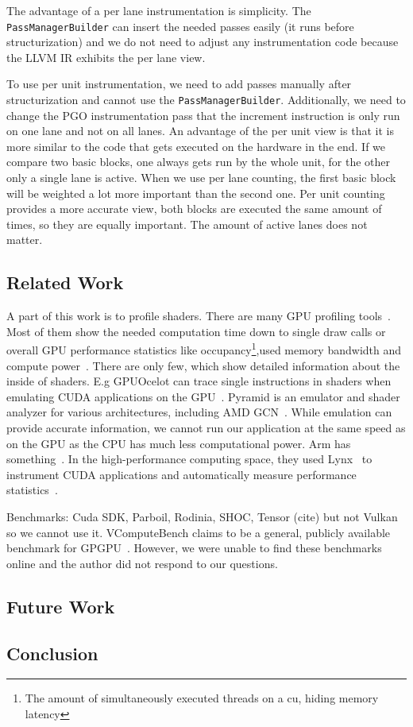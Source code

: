 The advantage of a per lane instrumentation is simplicity. The \texttt{PassManagerBuilder} can insert the needed passes easily (it runs before structurization) and we do not need to adjust any instrumentation code because the LLVM IR exhibits the per lane view.

To use per unit instrumentation, we need to add passes manually after structurization and cannot use the \texttt{PassManagerBuilder}.
Additionally, we need to change the PGO instrumentation pass that the increment instruction is only run on one lane and not on all lanes.
An advantage of the per unit view is that it is more similar to the code that gets executed on the hardware in the end.
If we compare two basic blocks, one always gets run by the whole unit, for the other only a single lane is active.
When we use per lane counting, the first basic block will be weighted a lot more important than the second one.
Per unit counting provides a more accurate view, both blocks are executed the same amount of times, so they are equally important. The amount of active lanes does not matter.

\subsection{Related Work}
\label{sub:relatedwork}
A part of this work is to profile shaders. There are many GPU profiling tools~\cite{UnityGPUProfiler, UnrealGPUProfiling, MSGPUUsage, PGI2014}.
Most of them show the needed computation time down to single draw calls or overall GPU performance statistics like occupancy\footnote{The amount of simultaneously executed threads on a \gls{cu}, hiding memory latency},used memory bandwidth and compute power~\cite{NvidiaNsight, NvidiaShaderPerf, AMDShaderAnalyzer}.
There are only few, which show detailed information about the inside of shaders. E.g GPUOcelot can trace single instructions in shaders when emulating CUDA applications on the GPU~\cite{GPUOcelot, Lakshminarayana2010}. Pyramid is an emulator and shader analyzer for various architectures, including AMD GCN~\cite{Pyramid}.
While emulation can provide accurate information, we cannot run our application at the same speed as on the GPU as the CPU has much less computational power.
Arm has something~\cite{Barton2013}.
In the high-performance computing space, they used Lynx~\cite{lynx} to instrument CUDA applications and automatically measure performance statistics~\cite{Farooqui2014}.

Benchmarks: Cuda SDK, Parboil, Rodinia, SHOC, Tensor (cite) but not Vulkan so we cannot use it. VComputeBench claims to be a general, publicly available benchmark for GPGPU~\cite{Mammeri2018}. However, we were unable to find these benchmarks online and the author did not respond to our questions.

\subsection{Future Work}
\label{sub:futurework}

\subsection{Conclusion}
\label{sub:conclusion}